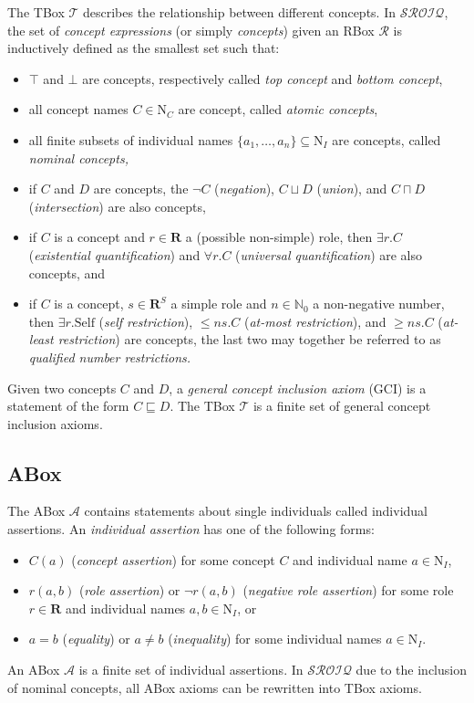 The TBox $\mathcal{T}$ describes the relationship between different concepts. In $\mathcal{SROIQ}$, the set of \emph{concept expressions} (or simply \emph{concepts}) given an RBox $\mathcal{R}$ is inductively defined as the smallest set such that:

\begin{itemize}
    \item $\top$ and $\bot$ are concepts, respectively called \emph{top concept} and \emph{bottom concept},
    \item all concept names $C \in \mathrm{N}_C$ are concept, called \emph{atomic concepts},
    \item all finite subsets of individual names $\{ a_1, \dots, a_n \} \subseteq \mathrm{N}_I$ are concepts, called \emph{nominal concepts,}
    \item if $C$ and $D$ are concepts, the $\lnot C$ (\emph{negation}), $C \sqcup D$ (\emph{union}), and $C \sqcap D$ (\emph{intersection}) are also concepts,
    \item if $C$ is a concept and $r \in \mathbf{R}$ a (possible non-simple) role, then $\exists r . C$ (\emph{existential quantification}) and $\forall r . C$ (\emph{universal quantification}) are also concepts, and
    \item if $C$ is a concept, $s \in \mathbf{R}^S$ a simple role and $n \in \mathbb{N}_0$ a non-negative number, then $\exists r . \mathrm{Self}$ (\emph{self restriction}), $\leq n s . C$ (\emph{at-most restriction}), and $\geq n s. C$ (\emph{at-least restriction}) are concepts, the last two may together be referred to as \emph{qualified number restrictions.}
\end{itemize}

Given two concepts $C$ and $D$, a \emph{general concept inclusion axiom} (GCI) is a statement of the form $C \sqsubseteq D$. The TBox $\mathcal{T}$ is a finite set of general concept inclusion axioms.

\subsection{ABox} \label{abox}

The ABox $\mathcal{A}$ contains statements about single individuals called individual assertions. An \emph{individual assertion} has one of the following forms:

\begin{itemize}
    \item $C(a)$ (\emph{concept assertion}) for some concept $C$ and individual name $a \in \mathrm{N}_I$,
    \item $r(a, b)$ (\emph{role assertion}) or $\lnot r (a, b)$ (\emph{negative role assertion}) for some role $r \in \mathbf{R}$ and individual names $a, b \in \mathrm{N}_I$, or
    \item $a = b$ (\emph{equality}) or $a \not = b$ (\emph{inequality}) for some individual names $a \in \mathrm{N}_I$.
\end{itemize}

An ABox $\mathcal{A}$ is a finite set of individual assertions. In $\mathcal{SROIQ}$ due to the inclusion of nominal concepts, all ABox axioms can be rewritten into TBox axioms.
